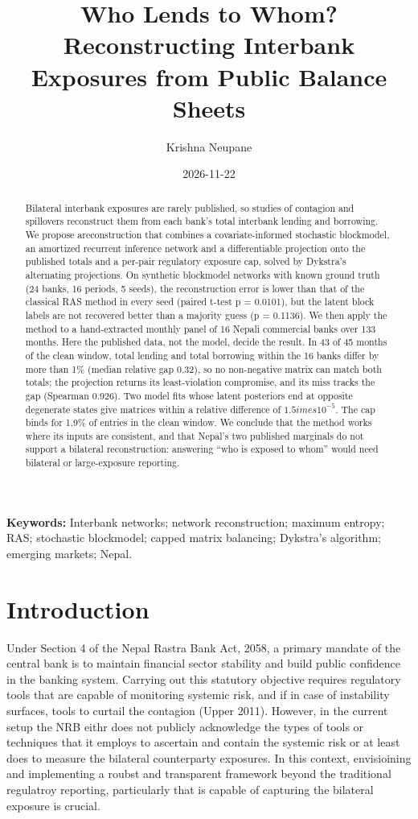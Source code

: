 \documentclass[
  a4paper,
]{article}
\title{Who Lends to Whom? Reconstructing Interbank Exposures from Public
Balance Sheets}
\author{Krishna Neupane}
\date{2026-11-22}
\begin{document}
\maketitle
\begin{abstract}
Bilateral interbank exposures are rarely published, so studies of
contagion and spillovers reconstruct them from each bank's total
interbank lending and borrowing. We propose areconstruction that
combines a covariate-informed stochastic blockmodel, an amortized
recurrent inference network and a differentiable projection onto the
published totals and a per-pair regulatory exposure cap, solved by
Dykstra's alternating projections. On synthetic blockmodel networks with
known ground truth (24 banks, 16 periods, 5 seeds), the reconstruction
error is lower than that of the classical RAS method in every seed
(paired t-test p = 0.0101), but the latent block labels are not
recovered better than a majority guess (p = 0.1136). We then apply the
method to a hand-extracted monthly panel of 16 Nepali commercial banks
over 133 months. Here the published data, not the model, decide the
result. In 43 of 45 months of the clean window, total lending and total
borrowing within the 16 banks differ by more than 1\% (median relative
gap 0.32), so no non-negative matrix can match both totals; the
projection returns its least-violation compromise, and its miss tracks
the gap (Spearman 0.926). Two model fits whose latent posteriors end at
opposite degenerate states give matrices within a relative difference of
\(1.5	imes10^{-5}\). The cap binds for 1.9\% of entries in the clean
window. We conclude that the method works where its inputs are
consistent, and that Nepal's two published marginals do not support a
bilateral reconstruction: answering ``who is exposed to whom'' would
need bilateral or large-exposure reporting.
\end{abstract}


\noindent\textbf{Keywords:} Interbank networks; network reconstruction;
maximum entropy; RAS; stochastic blockmodel; capped matrix balancing;
Dykstra's algorithm; emerging markets; Nepal. \vspace{1.5em}

\section{Introduction}\label{sec-introduction-network-reconstruction}

Under Section 4 of the Nepal Rastra Bank Act, 2058, a primary mandate of
the central bank is to maintain financial sector stability and build
public confidence in the banking system. Carrying out this statutory
objective requires regulatory tools that are capable of monitoring
systemic risk, and if in case of instability surfaces, tools to curtail
the contagion (Upper 2011). However, in the current setup the NRB eithr
does not publicly acknowledge the types of tools or techniques that it
employs to ascertain and contain the systemic risk or at least does to
measure the bilateral counterparty exposures. In this context,
envisioining and implementing a roubst and transparent framework beyond
the traditional regulatroy reporting, particularly that is capable of
capturing the bilateral exposure is crucial.
\end{document}
